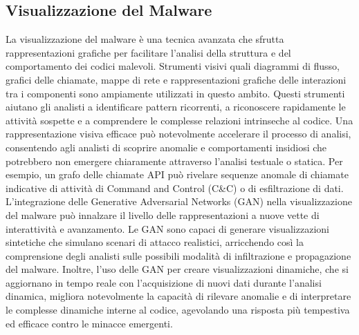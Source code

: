 \subsection{Visualizzazione del Malware}
La visualizzazione del malware è una tecnica avanzata che sfrutta rappresentazioni grafiche per facilitare l'analisi della struttura e del comportamento dei codici malevoli. Strumenti visivi quali diagrammi di flusso, grafici delle chiamate, mappe di rete e rappresentazioni grafiche delle interazioni tra i componenti sono ampiamente utilizzati in questo ambito. Questi strumenti aiutano gli analisti a identificare pattern ricorrenti, a riconoscere rapidamente le attività sospette e a comprendere le complesse relazioni intrinseche al codice.
Una rappresentazione visiva efficace può notevolmente accelerare il processo di analisi, consentendo agli analisti di scoprire anomalie e comportamenti insidiosi che potrebbero non emergere chiaramente attraverso l'analisi testuale o statica. Per esempio, un grafo delle chiamate API può rivelare sequenze anomale di chiamate indicative di attività di Command and Control (C\&C) o di esfiltrazione di dati.
L'integrazione delle Generative Adversarial Networks (GAN) nella visualizzazione del malware può innalzare il livello delle rappresentazioni a nuove vette di interattività e avanzamento. Le GAN sono capaci di generare visualizzazioni sintetiche che simulano scenari di attacco realistici, arricchendo così la comprensione degli analisti sulle possibili modalità di infiltrazione e propagazione del malware. Inoltre, l'uso delle GAN per creare visualizzazioni dinamiche, che si aggiornano in tempo reale con l'acquisizione di nuovi dati durante l'analisi dinamica, migliora notevolmente la capacità di rilevare anomalie e di interpretare le complesse dinamiche interne al codice, agevolando una risposta più tempestiva ed efficace contro le minacce emergenti.
\newpage
